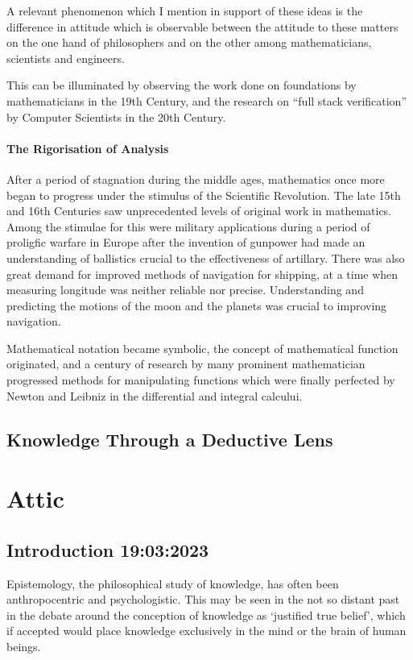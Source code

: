 \documentclass[10pt,titlepage]{book}
\begin{document}
A relevant phenomenon which I mention in support of these ideas is the difference in attitude which is observable between the attitude to these matters on the one hand of philosophers and on the other among mathematicians, scientists and engineers.

This can be illuminated by observing the work done on foundations by mathematicians in the 19th Century, and the research on ``full stack verification'' by Computer Scientists in the 20th Century.

\subsection{The Rigorisation of Analysis}

After a period of stagnation during the middle ages, mathematics once more began to progress under the stimulus of the Scientific Revolution.
The late 15th and 16th Centuries saw unprecedented levels of original work in mathematics.
Among the stimulae for this were military applications during a period of proligfic warfare in Europe after the invention of gunpower had made an understanding of ballistics crucial to the effectiveness of artillary.
There was also great demand for improved methods of navigation for shipping, at a time when measuring longitude was neither reliable nor precise.
Understanding and predicting the motions of the moon and the planets was crucial to improving navigation.


Mathematical notation became symbolic, the concept of mathematical function originated, and a century of research by many prominent mathematician progressed methods for manipulating functions which were finally perfected by Newton and Leibniz in the differential and integral calcului.




\chapter{Knowledge Through a Deductive Lens}\label{ChapKTDL}

\part{Attic}


\chapter{Introduction 19:03:2023}

Epistemology, the philosophical study of knowledge, has often been anthropocentric and psychologistic.
This may be seen in the not so distant past in the debate around the conception of knowledge as `justified true belief', which if accepted would place knowledge exclusively in the mind or the brain of human beings.
\end{document}
